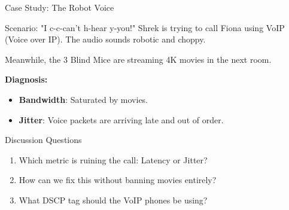 \documentclass[aspectratio=169]{beamer}  %
\begin{document}
\begin{frame}{Case Study: The Robot Voice}
    \begin{alertblock}{Scenario: "I c-c-can't h-hear y-you!"}
        \footnotesize
        Shrek is trying to call Fiona using VoIP (Voice over IP). The audio sounds robotic and choppy.
        
        Meanwhile, the 3 Blind Mice are streaming 4K movies in the next room.
        
        \vspace{0.2em}
        \textbf{Diagnosis:}
        \begin{itemize}
            \item \textbf{Bandwidth}: Saturated by movies.
            \item \textbf{Jitter}: Voice packets are arriving late and out of order.
        \end{itemize}
    \end{alertblock}
    \begin{block}{Discussion Questions}
        \footnotesize
        \begin{enumerate}
            \item Which metric is ruining the call: Latency or Jitter?
            \item How can we fix this without banning movies entirely?
            \item What DSCP tag should the VoIP phones be using?
        \end{enumerate}
    \end{block}
\end{frame}
\end{document}
